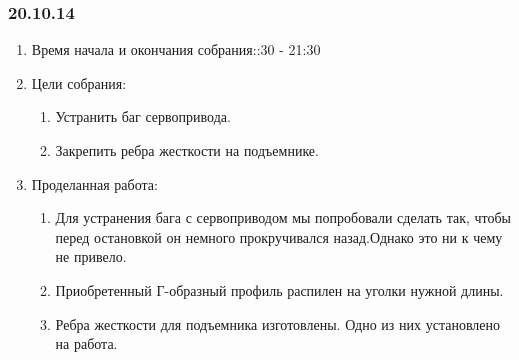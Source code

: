 	
\subsubsection{20.10.14}

\begin{enumerate}
	\item Время начала и окончания собрания::30 - 21:30
	\item Цели собрания:\newline
	\begin{enumerate}
	  \item Устранить баг сервопривода.\newline
	  
	  \item Закрепить ребра жесткости на подъемнике.\newline
	  
    \end{enumerate}
    
	\item Проделанная работа:\newline
	\begin{enumerate}
	  \item Для устранения бага с сервоприводом мы попробовали сделать так, чтобы перед остановкой он немного прокручивался назад.Однако это ни к чему не привело.\newline
      
      \item Приобретенный Г-образный профиль распилен на уголки нужной длины.\newline
      
      \item Ребра жесткости для подъемника изготовлены. Одно из них установлено на работа.\newline
      

\end{enumerate}
\end{enumerate}

